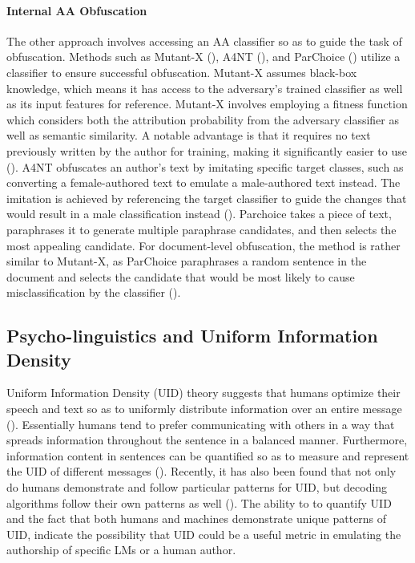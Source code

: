 \documentclass{article}
\begin{document}
\paragraph{Internal AA Obfuscation}
The other approach involves accessing an AA classifier so as to guide the task of obfuscation. Methods such as Mutant-X (\cite{Mahmood2019-wt}), A4NT (\cite{Shetty2017-vz}), and ParChoice (\cite{Grondahl2019-iv}) utilize a classifier to ensure successful obfuscation. Mutant-X assumes black-box knowledge, which means it has access to the adversary’s trained classifier as well as its input features for reference. Mutant-X involves employing a fitness function which considers both the attribution probability from the adversary classifier as well as semantic similarity. A notable advantage is that it requires no text previously written by the author for training, making it significantly easier to use (\cite{Mahmood2019-wt}). A4NT obfuscates an author's text by imitating specific target classes, such as converting a female-authored text to emulate a male-authored text instead. The imitation is achieved by referencing the target classifier to guide the changes that would result in a male classification instead (\cite{Shetty2017-vz}). Parchoice takes a piece of text, paraphrases it to generate multiple paraphrase candidates, and then selects the most appealing candidate. For document-level obfuscation, the method is rather similar to Mutant-X, as ParChoice paraphrases a random sentence in the document and selects the candidate that would be most likely to cause misclassification by the classifier (\cite{Grondahl2019-iv}).
\subsection{Psycho-linguistics and Uniform Information Density}
Uniform Information Density (UID) theory suggests that humans optimize their speech and text so as to uniformly distribute information over an entire message (\cite{Frank2008}). Essentially humans tend to prefer communicating with others in a way that spreads information throughout the sentence in a balanced manner. Furthermore, information content in sentences can be quantified so as to measure and represent the UID of different messages (\cite{Meister2021-tu}). Recently, it has also been found that not only do humans demonstrate and follow particular patterns for UID, but decoding algorithms follow their own patterns as well (\cite{Venkatraman2023-bx}). The ability to to quantify UID and the fact that both humans and machines demonstrate unique patterns of UID, indicate the possibility that UID could be a useful metric in emulating the authorship of specific LMs or a human author.
\end{document}
